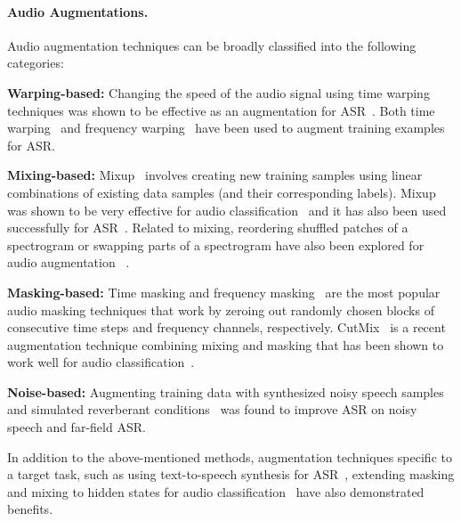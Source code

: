 \documentclass{article}
\begin{document}
\paragraph*{Audio Augmentations.} Audio augmentation techniques can be broadly classified into the following categories: \begin{enumerate*}
\item \textbf{Warping-based:} Changing the speed of the audio signal using time warping techniques was shown to be effective as an augmentation for ASR~\citep{speedpertubation}.
Both time warping~\citep{specaugment} and frequency warping~\citep{jaitly2013vocal} have been used to augment training examples for ASR.
\item \textbf{Mixing-based:} Mixup~\citep{zhang2018mixup} involves creating new training samples using linear combinations of existing data samples (and their corresponding labels). Mixup was shown to be very effective for audio classification~\citep{panns} and it has also been used successfully for ASR~\citep{mixupasr,meng2021mixspeech}. Related to mixing, reordering shuffled patches of a spectrogram or swapping parts of a spectrogram have also been explored for audio augmentation ~\citep{Carr_2021,specswap}.
\item \textbf{Masking-based:} Time masking and frequency masking~\citep{specaugment} are the most popular audio masking techniques that work by zeroing out randomly chosen blocks of consecutive time steps and frequency channels, respectively. CutMix~\citep{yun2019cutmix} is a recent augmentation technique combining mixing and masking that has been shown to work well for audio classification~\citep{deepspectrumlite}.
\item \textbf{Noise-based:} Augmenting training data with synthesized noisy speech samples~\citep{deepspeech} and simulated reverberant conditions~\citep{ko2017study,kim2017generation} was found to improve ASR on noisy speech and far-field ASR.
\end{enumerate*} 

In addition to the above-mentioned methods, augmentation techniques specific to a target task, such as using text-to-speech synthesis for ASR~\citep{tjandra2017listening,karita2019semi,wang2020improving}, extending masking and mixing to hidden states for audio classification~\citep{specaugmentpp} have also demonstrated benefits.
\end{document}
